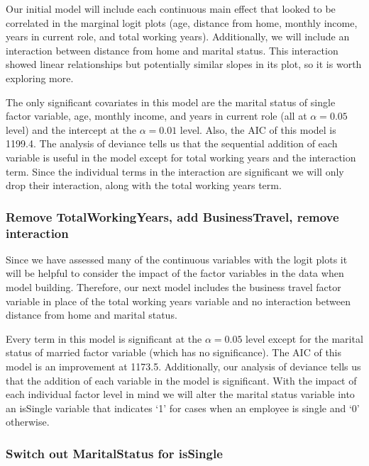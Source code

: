 \documentclass[]{article}
\begin{document}
Our initial model will include each continuous main effect that looked
to be correlated in the marginal logit plots (age, distance from home,
monthly income, years in current role, and total working years).
Additionally, we will include an interaction between distance from home
and marital status. This interaction showed linear relationships but
potentially similar slopes in its plot, so it is worth exploring more.

The only significant covariates in this model are the marital status of
single factor variable, age, monthly income, and years in current role
(all at \(\alpha = 0.05\) level) and the intercept at the
\(\alpha = 0.01\) level. Also, the AIC of this model is 1199.4. The
analysis of deviance tells us that the sequential addition of each
variable is useful in the model except for total working years and the
interaction term. Since the individual terms in the interaction are
significant we will only drop their interaction, along with the total
working years term.

\hypertarget{remove-totalworkingyears-add-businesstravel-remove-interaction}{%
\subsubsection{Remove TotalWorkingYears, add BusinessTravel, remove
interaction}\label{remove-totalworkingyears-add-businesstravel-remove-interaction}}

Since we have assessed many of the continuous variables with the logit
plots it will be helpful to consider the impact of the factor variables
in the data when model building. Therefore, our next model includes the
business travel factor variable in place of the total working years
variable and no interaction between distance from home and marital
status.

Every term in this model is significant at the \(\alpha = 0.05\) level
except for the marital status of married factor variable (which has no
significance). The AIC of this model is an improvement at 1173.5.
Additionally, our analysis of deviance tells us that the addition of
each variable in the model is significant. With the impact of each
individual factor level in mind we will alter the marital status
variable into an isSingle variable that indicates `1' for cases when an
employee is single and `0' otherwise.

\hypertarget{switch-out-maritalstatus-for-issingle}{%
\subsubsection{Switch out MaritalStatus for
isSingle}\label{switch-out-maritalstatus-for-issingle}}
\end{document}

